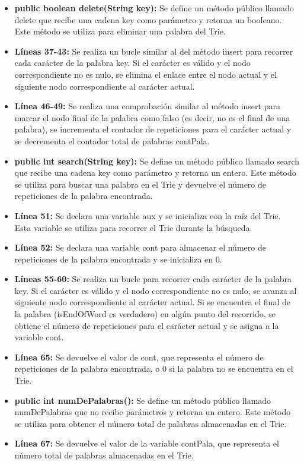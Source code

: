 \documentclass{article}
\begin{document}
\begin{itemize}
		\item \textbf{public boolean delete(String key):} Se define un método público llamado delete que recibe una cadena key como parámetro y retorna un booleano. Este método se utiliza para eliminar una palabra del Trie.

		\item \textbf{Líneas 37-43:} Se realiza un bucle similar al del método insert para recorrer cada carácter de la palabra key. Si el carácter es válido y el nodo correspondiente no es nulo, se elimina el enlace entre el nodo actual y el siguiente nodo correspondiente al carácter actual.

		\item \textbf{Línea 46-49:} Se realiza una comprobación similar al método insert para marcar el nodo final de la palabra como falso (es decir, no es el final de una palabra), se incrementa el contador de repeticiones para el carácter actual y se decrementa el contador total de palabras contPala.

		\item \textbf{public int search(String key):} Se define un método público llamado search que recibe una cadena key como parámetro y retorna un entero. Este método se utiliza para buscar una palabra en el Trie y devuelve el número de repeticiones de la palabra encontrada.

		\item \textbf{Línea 51:} Se declara una variable aux y se inicializa con la raíz del Trie. Esta variable se utiliza para recorrer el Trie durante la búsqueda.

		\item \textbf{Línea 52:} Se declara una variable cont para almacenar el número de repeticiones de la palabra encontrada y se inicializa en 0.

		\item \textbf{Líneas 55-60:} Se realiza un bucle para recorrer cada carácter de la palabra key. Si el carácter es válido y el nodo correspondiente no es nulo, se avanza al siguiente nodo correspondiente al carácter actual. Si se encuentra el final de la palabra (isEndOfWord es verdadero) en algún punto del recorrido, se obtiene el número de repeticiones para el carácter actual y se asigna a la variable cont.

		\item \textbf{Línea 65:} Se devuelve el valor de cont, que representa el número de repeticiones de la palabra encontrada, o 0 si la palabra no se encuentra en el Trie.

		\item \textbf{public int numDePalabras():} Se define un método público llamado numDePalabras que no recibe parámetros y retorna un entero. Este método se utiliza para obtener el número total de palabras almacenadas en el Trie.

		\item \textbf{Línea 67:} Se devuelve el valor de la variable contPala, que representa el número total de palabras almacenadas en el Trie.
	\end{itemize}	
	
\end{document}
